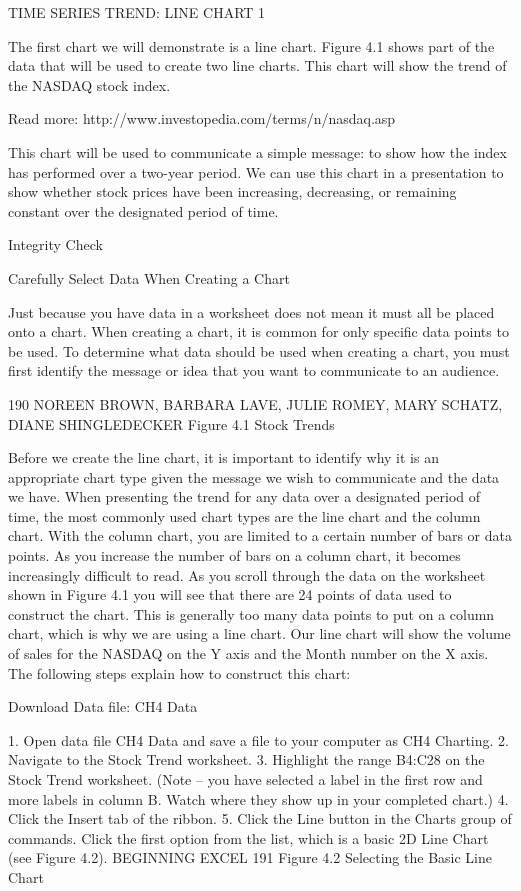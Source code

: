 TIME SERIES TREND: LINE CHART 1

The first chart we will demonstrate is a line chart. Figure 4.1 shows part of the data that will be used
to create two line charts. This chart will show the trend of the NASDAQ stock index.

Read more: http://www.investopedia.com/terms/n/nasdaq.asp

This chart will be used to communicate a simple message: to show how the index has performed over
a two-year period. We can use this chart in a presentation to show whether stock prices have been
increasing, decreasing, or remaining constant over the designated period of time.




Integrity Check

Carefully Select Data When Creating a Chart

Just because you have data in a worksheet does not mean it must all be placed onto a chart. When creating a chart,
it is common for only specific data points to be used. To determine what data should be used when creating a chart,
you must first identify the message or idea that you want to communicate to an audience.




190 NOREEN BROWN, BARBARA LAVE, JULIE ROMEY, MARY SCHATZ, DIANE SHINGLEDECKER
Figure 4.1 Stock Trends


Before we create the line chart, it is important to identify why it is an appropriate chart type given the
message we wish to communicate and the data we have. When presenting the trend for any data over
a designated period of time, the most commonly used chart types are the line chart and the column
chart. With the column chart, you are limited to a certain number of bars or data points. As you
increase the number of bars on a column chart, it becomes increasingly difficult to read. As you scroll
through the data on the worksheet shown in Figure 4.1 you will see that there are 24 points of data
used to construct the chart. This is generally too many data points to put on a column chart, which is
why we are using a line chart. Our line chart will show the volume of sales for the NASDAQ on the Y
axis and the Month number on the X axis. The following steps explain how to construct this chart:

Download Data file: CH4 Data

1. Open data file CH4 Data and save a file to your computer as CH4 Charting.
2. Navigate to the Stock Trend worksheet.
3. Highlight the range B4:C28 on the Stock Trend worksheet. (Note – you have selected a label in
the first row and more labels in column B. Watch where they show up in your completed chart.)
4. Click the Insert tab of the ribbon.
5. Click the Line button in the Charts group of commands. Click the first option from the list,
which is a basic 2D Line Chart (see Figure 4.2).
BEGINNING EXCEL 191
Figure 4.2 Selecting the Basic Line Chart


